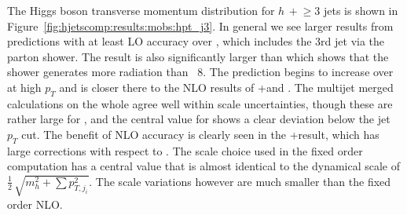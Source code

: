 The Higgs boson transverse momentum distribution for $h\,+\!\ge\!\!3$ jets is shown in
Figure~\ref{fig:hjetscomp:results:mobs:hpt_j3}. In general we see larger
results from predictions with at least LO accuracy over \hjetscompPowheg, which includes
the 3rd jet via the parton shower. The \hjetscompSherpa \hjetscompNNLOPS result is also
significantly larger than \hjetscompPowheg which shows that the \hjetscompSherpa shower generates
more radiation than \hjetscompPythia~8. The \hjetscompHej prediction begins to increase over
\hjetscompPowheg at high $p_T$ and is closer there to the NLO results of \hjetscompGoSam{}+\hjetscompSherpa and
\hjetscompSherpa \hjetscompMEPSatNLO. The multijet merged calculations on the whole agree well
within scale uncertainties, though these are rather large for \hjetscompMGaMC, and the
central value for \hjetscompHerwig shows a clear deviation below the jet $p_T$ cut. The
benefit of NLO accuracy is clearly seen in the \hjetscompGoSam{}+\hjetscompSherpa result, which has large
corrections with respect to  \hjetscompPowheg. The \hjetscompMinlo scale choice used in the fixed order
computation has a central value that is almost identical to the dynamical scale
of $\tfrac{1}{2}\,\sqrt{m_{h}^2+\sum p_{T,j_i}^2}$. The scale variations
however are much smaller than the fixed order NLO.

